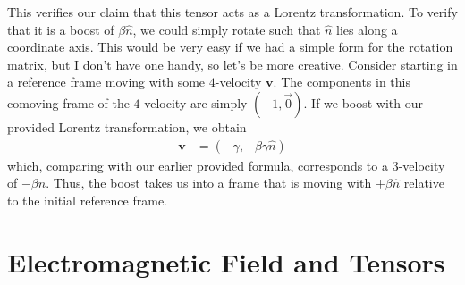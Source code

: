 \documentclass[12pt]{report}
\begin{document}
\begin{description}
        This verifies our claim that this tensor acts as a Lorentz
        transformation. To verify that it is a boost of $\beta\hat{n}$, we could
        simply rotate such that $\hat{n}$ lies along a coordinate axis. This
        would be very easy if we had a simple form for the rotation matrix, but
        I don't have one handy, so let's be more creative. Consider starting in
        a reference frame moving with some $4$-velocity $\mathbf{v}$. The
        components in this comoving frame of the $4$-velocity are simply $(-1,
        \vec{0})$. If we boost with our provided Lorentz transformation, we
        obtain
        \begin{align}
            \mathbf{v} &= \left( -\gamma, -\beta\gamma \hat{n} \right)
        \end{align}
        which, comparing with our earlier provided formula, corresponds to a
        $3$-velocity of $-\beta \hat{n}$. Thus, the boost takes us into a frame
        that is moving with $+\beta \hat{n}$ relative to the initial reference
        frame.
\end{description}

\section{Electromagnetic Field and Tensors}
\end{document}
